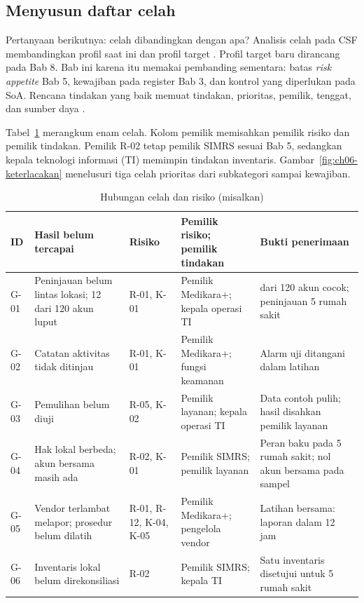 \subsection*{Menyusun daftar celah}

Pertanyaan berikutnya: celah dibandingkan dengan apa? Analisis celah pada CSF membandingkan profil
saat ini dan profil target \cite{nistcsf2}. Profil target baru dirancang pada Bab 8. Bab ini karena
itu memakai pembanding sementara: batas \textit{risk appetite} Bab 5, kewajiban pada register Bab 3,
dan kontrol yang diperlukan pada SoA. Rencana tindakan yang baik memuat tindakan, prioritas, pemilik,
tenggat, dan sumber daya \cite{c06-nist-sp1301}.

Tabel~\ref{tab:ch06-celah} merangkum enam celah. Kolom pemilik memisahkan pemilik risiko dan pemilik
tindakan. Pemilik R-02 tetap pemilik SIMRS sesuai Bab 5, sedangkan kepala teknologi informasi (TI)
memimpin tindakan inventaris. Gambar~\ref{fig:ch06-keterlacakan} menelusuri tiga celah prioritas dari
subkategori sampai kewajiban.

\begin{table}[!htb]
  \centering\small
  \caption{Hubungan celah dan risiko (misalkan)}\label{tab:ch06-celah}
  \begin{tabularx}{\textwidth}{|>{\raggedright\arraybackslash}p{}|>{\raggedright\arraybackslash}X|>{\raggedright\arraybackslash}p{}|>{\raggedright\arraybackslash}p{}|>{\raggedright\arraybackslash}X|}
    \hline
    \textbf{ID} & \textbf{Hasil belum tercapai} & \textbf{Risiko} & \textbf{Pemilik risiko; pemilik
    tindakan} & \textbf{Bukti penerimaan} \\ \hline
    G-01 & Peninjauan belum lintas lokasi; 12 dari 120 akun luput & R-01, K-01 & Pemilik Medikara+;
    kepala operasi TI & 120 dari 120 akun cocok; peninjauan 5 rumah sakit \\ \hline
    G-02 & Catatan aktivitas tidak ditinjau & R-01, K-01 & Pemilik Medikara+; fungsi keamanan & Alarm
    uji ditangani dalam latihan \\ \hline
    G-03 & Pemulihan belum diuji & R-05, K-02 & Pemilik layanan; kepala operasi TI & Data contoh
    pulih; hasil disahkan pemilik layanan \\ \hline
    G-04 & Hak lokal berbeda; akun bersama masih ada & R-02, K-01 & Pemilik SIMRS; pemilik layanan &
    Peran baku pada 5 rumah sakit; nol akun bersama pada sampel \\ \hline
    G-05 & Vendor terlambat melapor; prosedur belum dilatih & R-01, R-12, K-04, K-05 & Pemilik
    Medikara+; pengelola vendor & Latihan bersama: laporan dalam 12 jam \\ \hline
    G-06 & Inventaris lokal belum direkonsiliasi & R-02 & Pemilik SIMRS; kepala TI & Satu inventaris
    disetujui untuk 5 rumah sakit \\ \hline
  \end{tabularx}
\end{table}

